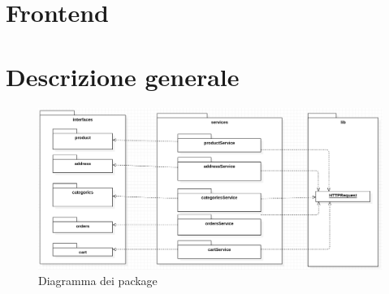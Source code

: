 \section{Frontend}
\section{Descrizione generale}
\begin{figure}[H]
	\centering
	\includegraphics[width=\textwidth]{Immagini/DiagrammaDeiPackage.png}
	\caption{Diagramma dei package}
	\label{fig:fe-packages}
\end{figure}